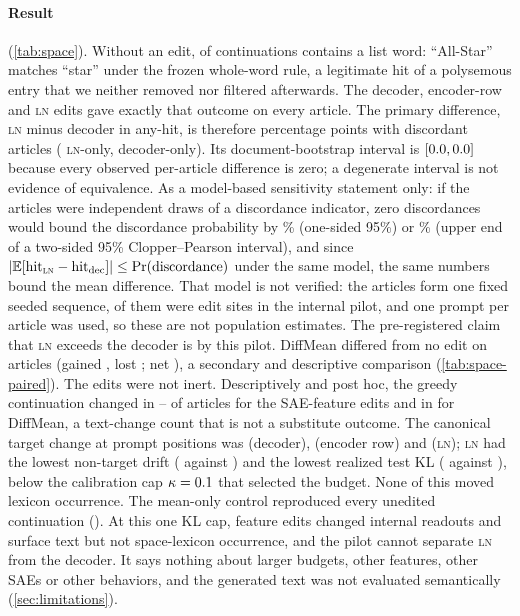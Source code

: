 \documentclass{article}
\theoremstyle{plain}
\theoremstyle{definition}
\theoremstyle{remark}
\newcommand{\LN}{\textsc{ln}}
\begin{document}
\paragraph{Result} (\cref{tab:space}). Without an edit, \SpBoth{} of \SpDocs{} continuations
contains a list word: ``All-Star'' matches ``star'' under the frozen whole-word rule, a
legitimate hit of a polysemous entry that we neither removed nor filtered afterwards. The
decoder, encoder-row and \LN{} edits gave exactly that outcome on every article. The primary
difference, \LN{} minus decoder in any-hit, is therefore \SpPrim{} percentage points with
\SpDiscPrim{} discordant articles (\SpDiscA{} \LN-only, \SpDiscB{} decoder-only). Its
document-bootstrap interval is $[0.0, 0.0]$ because every observed per-article
difference is zero; a degenerate interval is not evidence of equivalence. As a model-based
sensitivity statement only: if the \SpDocs{} articles were independent draws of a
discordance indicator, zero discordances would bound the discordance probability by
\SpBoundOne\% (one-sided 95\%) or \SpBoundTwo\% (upper end of a two-sided 95\%
Clopper--Pearson interval), and since
$|\mathbb{E}[\mathrm{hit}_{\LN}-\mathrm{hit}_{\mathrm{dec}}]|\le\Pr(\text{discordance})$ under
the same model, the same numbers bound the mean difference. That model is not verified: the
articles form one fixed seeded sequence, \SpOverlapPilot{} of them were edit sites in the
internal pilot, and one prompt per article was used, so these are not population estimates.
The pre-registered claim that \LN{} exceeds the decoder is \SpVerdict{} by this pilot.
DiffMean differed from no edit on \SpDmDisc{} articles (gained
\SpDmGain, lost \SpDmLoss; net \SpDmNet), a secondary and descriptive comparison
(\cref{tab:space-paired}). The edits were not inert. Descriptively and post hoc, the greedy
continuation changed in \SpChangedEnc--\SpChangedLn{} of \SpDocs{} articles for the
SAE-feature edits and in \SpChangedDm{} for DiffMean, a text-change count that is not a
substitute outcome. The canonical target change at prompt positions was
\SpDajDec{} (decoder), \SpDajEnc{} (encoder row) and \SpDajLn{} (\LN); \LN{} had the lowest
non-target drift (\SpDallLn{} against \SpDallDec) and the lowest realized test KL
(\SpKLLn{} against \SpKLDec), below the calibration cap $\kappa=0.1$ that selected the
budget. None of this moved lexicon occurrence. The mean-only control reproduced every
unedited continuation (\SpCtrlSame). At this one KL cap, feature edits changed internal
readouts and surface text but not space-lexicon occurrence, and the pilot cannot separate
\LN{} from the decoder. It says nothing about larger budgets, other features, other SAEs or
other behaviors, and the generated text was not evaluated semantically
(\cref{sec:limitations}).
\end{document}
